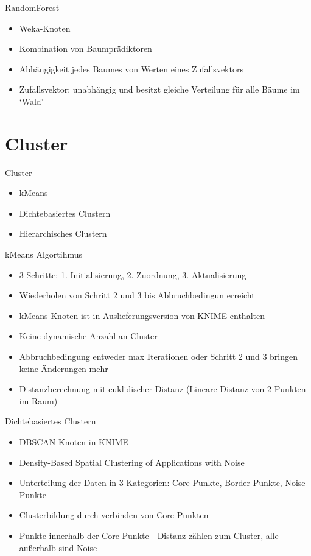 \documentclass[
	handout,
  	aspectratio=169
]{beamer}
\begin{document}
		\begin{frame}{RandomForest}		
			\begin{itemize}
				\item Weka-Knoten
				\item Kombination von Baumprädiktoren
				\item Abhängigkeit jedes Baumes von Werten eines Zufallsvektors
				\item Zufallsvektor: unabhängig und besitzt gleiche Verteilung für alle Bäume im ‘Wald’
			\end{itemize}	
		\end{frame}
	
	\section{Cluster}	
	\frame{\sectionpage}	
		
		\begin{frame}{Cluster}
			\begin{itemize}
				\item kMeans
				\item Dichtebasiertes Clustern
				\item Hierarchisches Clustern
			\end{itemize}
		\end{frame}
		
		\begin{frame}{kMeans Algortihmus}
			\begin{itemize}
				\item 3 Schritte: 1. Initialisierung, 2. Zuordnung, 3. Aktualisierung
				\item Wiederholen von Schritt 2 und 3 bis Abbruchbedingun erreicht
				\item kMeans Knoten ist in Auslieferungsversion von KNIME enthalten
				\item Keine dynamische Anzahl an Cluster
				\item Abbruchbedingung entweder max Iterationen oder Schritt 2 und 3 bringen keine Änderungen mehr
				\item Distanzberechnung mit euklidischer Distanz (Lineare Distanz von 2 Punkten im Raum)
			\end{itemize}
		\end{frame}
		
		\begin{frame}{Dichtebasiertes Clustern}
			\begin{itemize}
				\item DBSCAN Knoten in KNIME
				\item Density-Based Spatial Clustering of Applications with Noise
				\item Unterteilung der Daten in 3 Kategorien: Core Punkte, Border Punkte, Noise Punkte
				\item Clusterbildung durch verbinden von Core Punkten
				\item Punkte innerhalb der Core Punkte - Distanz zählen zum Cluster, alle außerhalb sind Noise
			\end{itemize}
		\end{frame}
		
\end{document}

